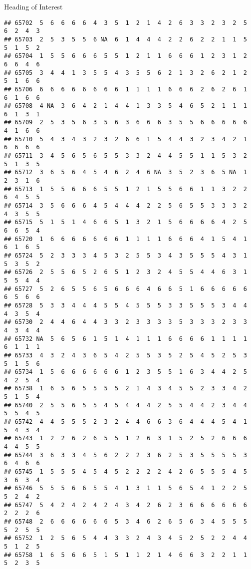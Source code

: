 \documentclass[
  ignorenonframetext,
]{beamer}
\begin{document}
\begin{frame}[fragile]{Heading of Interest}
\begin{verbatim}
## 65702  5  6  6  6  6  4  3  5  1  2  1  4  2  6  3  3  2  3  2  5  6  2  4  3
## 65703  2  5  3  5  5  6 NA  6  1  4  4  4  2  2  6  2  2  1  1  5  5  1  5  2
## 65704  1  5  5  6  6  6  5  5  1  2  1  1  6  6  6  1  2  3  1  2  6  6  4  6
## 65705  3  4  4  1  3  5  5  4  3  5  5  6  2  1  3  2  6  2  1  2  5  1  6  6
## 65706  6  6  6  6  6  6  6  6  1  1  1  1  6  6  6  2  6  2  6  1  6  1  6  6
## 65708  4 NA  3  6  4  2  1  4  4  1  3  3  5  4  6  5  2  1  1  1  6  1  3  1
## 65709  2  5  3  5  6  3  5  6  3  6  6  6  3  5  5  6  6  6  6  6  4  1  6  6
## 65710  5  4  3  4  3  2  3  2  6  6  1  5  4  4  3  2  3  4  2  1  6  6  6  6
## 65711  3  4  5  6  5  6  5  5  3  3  2  4  4  5  5  1  1  5  3  2  5  1  3  5
## 65712  3  6  5  6  4  5  4  6  2  4  6 NA  3  5  2  3  6  5 NA  1  2  3  1  6
## 65713  1  5  5  6  6  6  5  5  1  2  1  5  5  6  6  1  1  3  2  2  6  4  5  5
## 65714  3  5  6  6  6  4  5  4  4  4  2  2  5  6  5  5  3  3  3  2  4  3  5  5
## 65715  5  1  5  1  4  6  6  5  1  3  2  1  5  6  6  6  6  4  2  5  6  6  5  4
## 65720  1  6  6  6  6  6  6  6  1  1  1  1  6  6  6  4  1  5  4  1  6  1  6  5
## 65724  5  2  3  3  3  4  5  3  2  5  5  3  4  3  5  5  5  4  3  1  5  3  5  2
## 65726  2  5  5  6  5  2  6  5  1  2  3  2  4  5  5  4  4  6  3  1  5  5  4  4
## 65727  5  2  6  5  5  6  5  6  6  6  4  6  6  5  1  6  6  6  6  6  6  5  6  6
## 65728  5  3  3  4  4  4  5  5  4  5  5  5  3  3  5  5  5  3  4  4  4  3  5  4
## 65730  2  4  4  6  4  4  3  3  2  3  3  3  3  5  3  3  3  2  3  3  4  3  4  4
## 65732 NA  5  6  5  6  1  5  1  4  1  1  1  6  6  6  6  1  1  1  1  6  1  1  1
## 65733  4  3  2  4  3  6  5  4  2  5  5  3  5  2  5  4  5  2  5  3  5  1  5  6
## 65734  1  5  6  6  6  6  6  6  1  2  3  5  5  1  6  3  4  4  2  5  4  2  5  4
## 65738  1  6  5  6  5  5  5  5  2  1  4  3  4  5  5  2  3  3  4  2  5  1  5  4
## 65740  2  5  5  6  5  5  4  5  4  4  4  2  5  5  4  4  2  3  4  4  5  5  4  5
## 65742  4  4  5  5  5  2  3  2  4  4  6  6  3  6  4  4  4  5  4  1  5  4  3  4
## 65743  1  2  2  6  2  6  5  5  1  2  6  3  1  5  2  5  2  6  6  6  4  4  5  5
## 65744  3  6  3  3  4  5  6  2  2  2  3  6  2  5  3  5  5  5  5  3  6  4  6  6
## 65745  1  5  5  5  4  5  4  5  2  2  2  2  4  2  6  5  5  5  4  5  3  6  3  4
## 65746  5  5  5  6  6  5  5  4  1  3  1  1  5  6  5  4  1  2  2  5  5  2  4  2
## 65747  5  4  2  4  2  4  2  4  3  4  2  6  2  3  6  6  6  6  6  6  2  2  2  6
## 65748  2  6  6  6  6  6  6  5  3  4  6  2  6  5  6  3  4  5  5  5  5  2  5  5
## 65752  1  2  5  6  5  4  4  3  3  2  4  3  4  5  2  5  2  2  4  4  5  1  2  5
## 65758  1  6  5  6  6  5  1  5  1  1  2  1  4  6  6  3  2  2  1  1  5  2  3  5

\end{verbatim}
\end{frame}
\end{document}
